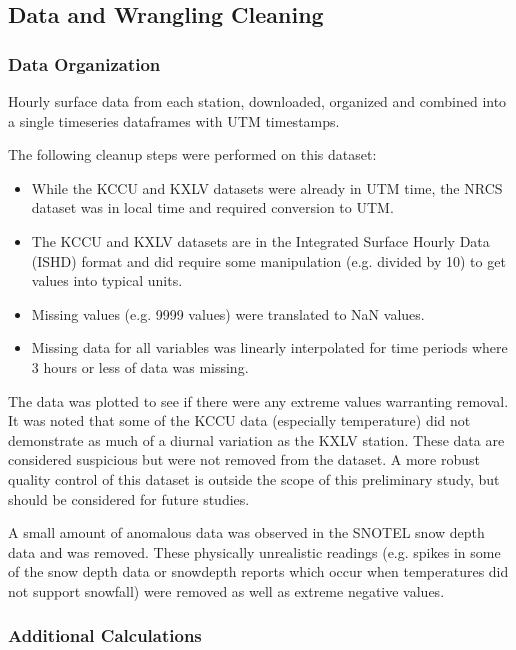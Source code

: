 \documentclass[11pt]{article}
\providecommand{\tightlist}{%
      \setlength{\itemsep}{0pt}\setlength{\parskip}{0pt}}
\begin{document}
\subsection{Data and Wrangling
Cleaning}\label{data-and-wrangling-cleaning}

\subsubsection{Data Organization}\label{data-organization}

Hourly surface data from each station, downloaded, organized and
combined into a single timeseries dataframes with UTM timestamps.

The following cleanup steps were performed on this dataset:

\begin{itemize}
\tightlist
\item
  While the KCCU and KXLV datasets were already in UTM time, the NRCS
  dataset was in local time and required conversion to UTM.\\
\item
  The KCCU and KXLV datasets are in the Integrated Surface Hourly Data
  (ISHD) format and did require some manipulation (e.g. divided by 10)
  to get values into typical units.
\item
  Missing values (e.g. 9999 values) were translated to NaN values.
\item
  Missing data for all variables was linearly interpolated for time
  periods where 3 hours or less of data was missing.
\end{itemize}

The data was plotted to see if there were any extreme values warranting
removal. It was noted that some of the KCCU data (especially
temperature) did not demonstrate as much of a diurnal variation as the
KXLV station. These data are considered suspicious but were not removed
from the dataset. A more robust quality control of this dataset is
outside the scope of this preliminary study, but should be considered
for future studies.

A small amount of anomalous data was observed in the SNOTEL snow depth
data and was removed. These physically unrealistic readings (e.g. spikes
in some of the snow depth data or snowdepth reports which occur when
temperatures did not support snowfall) were removed as well as extreme
negative values.

\subsubsection{Additional Calculations}\label{additional-calculations}
\end{document}

